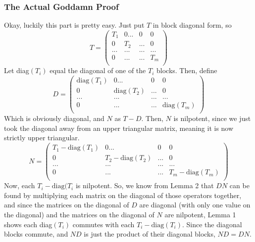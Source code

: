 \documentclass{article}
\begin{document}
\subsubsection*{The Actual Goddamn Proof}
Okay, luckily this part is pretty easy. Just put $T$ in block diagonal form, so 
\[
T = \begin{pmatrix} 
T_{1} & 0 ... & 0& 0\\
0 & T_{2} & ... & 0\\
... &... &... & ...\\
0 & ... & ... & T_{m}\\
\end{pmatrix}
\]
Let diag$(T_{i})$ equal the diagonal of one of the $T_{i}$ blocks. Then, define 
\[ D = \begin{pmatrix}
\text{diag}(T_{1}) & 0 ... & 0& 0\\
0 & \text{diag}(T_{2}) & ... & 0\\
... &... &... & ...\\
0 & ... & ... & \text{diag}(T_{m})\\
\end{pmatrix}
\]
Which is obviously diagonal, and $N$ as $T-D$. Then, $N$ is nilpotent, since we just took the diagonal away from an upper triangular matrix, meaning it is now strictly upper triangular. 
\[
N = \begin{pmatrix}
T_{1} - \text{diag}(T_{1}) & 0 ... & 0& 0\\
0 & T_{2} - \text{diag}(T_{2}) & ... & 0\\
... &... &... & ...\\
0 & ... & ... & T_{m}-\text{diag}(T_{m})\\
\end{pmatrix}
\]
Now, each $T_{i} - \text{diag}(T_{i}$ is nilpotent. So, we know from Lemma 2 that $DN$ can be found by multiplying each matrix on the diagonal of those operators together, and since the matrices on the diagonal of $D$ are diagonal (with only one value on the diagonal) and the matrices on the diagonal of $N$ are nilpotent, Lemma 1 shows each diag$(T_{i})$ commutes with each $T_{i} - \text{diag}(T_{i})$. Since the diagonal blocks commute, and $ND$ is just the product of their diagonal blocks, $ND = DN$. 
\end{document}
